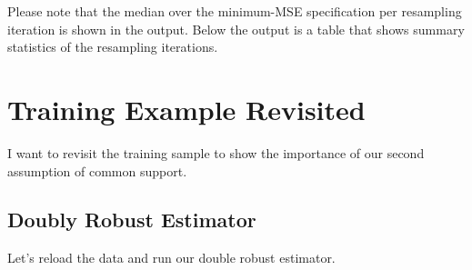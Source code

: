 \documentclass[
]{book}
\begin{document}
Please note that the median over the minimum-MSE specification per resampling iteration is shown in the output. Below the output is a table that shows summary statistics of the resampling iterations.

\chapter{Training Example Revisited}\label{training-example-revisited}

I want to revisit the training sample to show the importance of our second assumption of common support.

\section{Doubly Robust Estimator}\label{doubly-robust-estimator}

Let's reload the data and run our double robust estimator.
\end{document}
